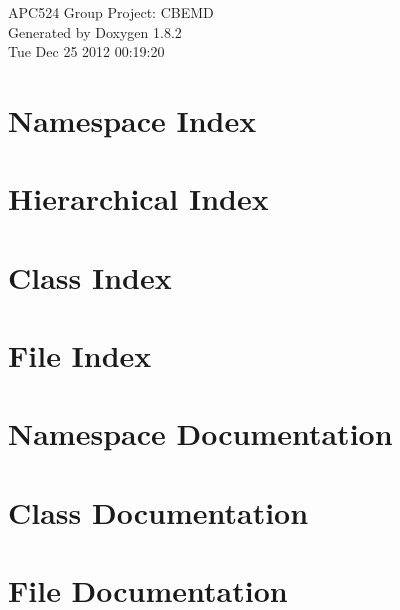 \documentclass{book}
\begin{document}
\hypersetup{pageanchor=false,citecolor=blue}
\begin{titlepage}
\vspace*{7cm}
\begin{center}
{\Large A\-P\-C524 Group Project\-: C\-B\-E\-M\-D }\\
\vspace*{1cm}
{\large Generated by Doxygen 1.8.2}\\
\vspace*{0.5cm}
{\small Tue Dec 25 2012 00:19:20}\\
\end{center}
\end{titlepage}
\clearemptydoublepage
{}
\tableofcontents
\clearemptydoublepage
{}
\hypersetup{pageanchor=true,citecolor=blue}
\chapter{Namespace Index}

\chapter{Hierarchical Index}

\chapter{Class Index}

\chapter{File Index}

\chapter{Namespace Documentation}


\chapter{Class Documentation}














\chapter{File Documentation}


























\printindex
\end{document}
